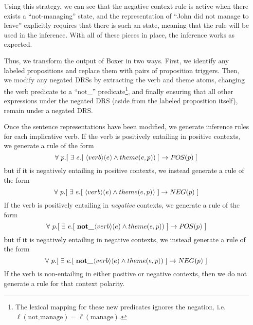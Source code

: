 Using this strategy, we can see that the negative context rule is active when
there exists a ``not-managing'' state, and the representation of ``John did
not manage to leave'' explicitly requires that there is such an state, meaning
that the rule will be used in the inference.  With all of these pieces in place,
the inference works as expected.

Thus, we transform the output of Boxer in two ways.  First, we identify any
labeled propositions and replace them with pairs of proposition triggers.  Then,
we modify any negated DRSs by extracting the verb and theme atoms, changing the
verb predicate to a ``not\_'' predicate\footnote{The lexical mapping for these new
  predicates ignores the negation, i.e.\ $\ell(\mathrm{not\_manage}) = \ell(\mathrm{manage})$.}, and finally ensuring that all other
expressions under the negated DRS (aside from the labeled proposition itself),
remain under a negated DRS.

Once the sentence representations have been modified, we generate inference
rules for each implicative verb.  If the verb is positively entailing in
positive contexts, we generate a rule of the form 
\[ \forall~ p.[~ \exists~ e.[~ \langle verb \rangle(e) \land theme(e,p)) ~] \to \POSPRED{p} ~] \]
but if it is negatively entailing in positive contexts, we instead generate a rule of the form
\[ \forall~ p.[~ \exists~ e.[~ \langle verb \rangle(e) \land theme(e,p)) ~] \to \NEGPRED{p} ~] \]
If the verb is positively entailing in {\it negative} contexts, we generate a rule of the form
\[ \forall~ p.[~ \exists~ e.[~ \textbf{not\_}\langle verb \rangle(e) \land theme(e,p)) ~] \to \POSPRED{p} ~] \]
but if it is negatively entailing in negative contexts, we instead generate a rule of the form
\[ \forall~ p.[~ \exists~ e.[~ \textbf{not\_}\langle verb \rangle(e) \land theme(e,p)) ~] \to \NEGPRED{p} ~] \]
If the verb is non-entailing in either positive or negative contexts, then we do
not generate a rule for that context polarity. 

